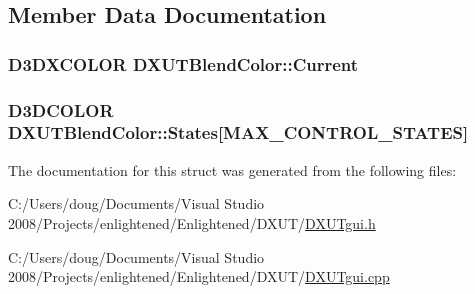 \subsection{Member Data Documentation}
\hypertarget{struct_d_x_u_t_blend_color_a66f7c28adcd07a58903d5637cc591ec1}{
\subsubsection[{Current}]{\setlength{\rightskip}{0pt plus 5cm}D3DXCOLOR {\bf DXUTBlendColor::Current}}}
\label{struct_d_x_u_t_blend_color_a66f7c28adcd07a58903d5637cc591ec1}
\hypertarget{struct_d_x_u_t_blend_color_a460adbd94a1a6d14215e5f674fe4ceb3}{
\subsubsection[{States}]{\setlength{\rightskip}{0pt plus 5cm}D3DCOLOR {\bf DXUTBlendColor::States}\mbox{[}MAX\_\-CONTROL\_\-STATES\mbox{]}}}
\label{struct_d_x_u_t_blend_color_a460adbd94a1a6d14215e5f674fe4ceb3}


The documentation for this struct was generated from the following files:\begin{DoxyCompactItemize}
\item 
C:/Users/doug/Documents/Visual Studio 2008/Projects/enlightened/Enlightened/DXUT/\hyperlink{_d_x_u_tgui_8h}{DXUTgui.h}\item 
C:/Users/doug/Documents/Visual Studio 2008/Projects/enlightened/Enlightened/DXUT/\hyperlink{_d_x_u_tgui_8cpp}{DXUTgui.cpp}\end{DoxyCompactItemize}

